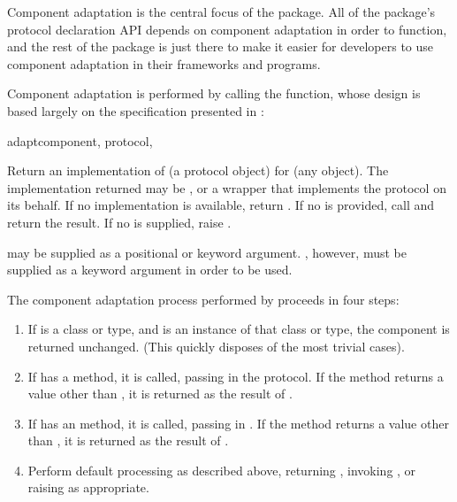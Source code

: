 \begin{verbatim%
}
\begin{verbatim%
}
Component adaptation is the central focus of the  package.
All of the package's protocol declaration API depends on component adaptation
in order to function, and the rest of the package is just there to make it
easier for developers to use component adaptation in their frameworks and
programs.

Component adaptation is performed by calling the  function,
whose design is based largely on the specification presented in :

\begin{funcdesc}{adapt}{component, protocol,
}

Return an implementation of  (a protocol object) for
 (any object).  The implementation returned may be
, or a wrapper that implements the protocol on its
behalf.  If no implementation is available, return .  If no
 is provided, call  and return the result.  If no  is supplied,
raise .

 may be supplied as a positional or keyword argument.
, however, must be supplied as a keyword argument in order
to be used.
\end{funcdesc}

The component adaptation process performed by  proceeds
in four steps:

\begin{enumerate}

\item If  is a class or type, and  is an instance
of that class or type, the component is returned unchanged.  (This quickly
disposes of the most trivial cases).

\item If  has a  method, it is called,
passing in the protocol.  If the method returns a value other than
, it is returned as the result of .

\item If  has an  method, it is called,
passing in .  If the method returns a value other than
, it is returned as the result of .

\item Perform default processing as described above, returning ,
invoking , or raising  as
appropriate.


\end{enumerate}
\end{verbatim%
}
\end{verbatim%
}
